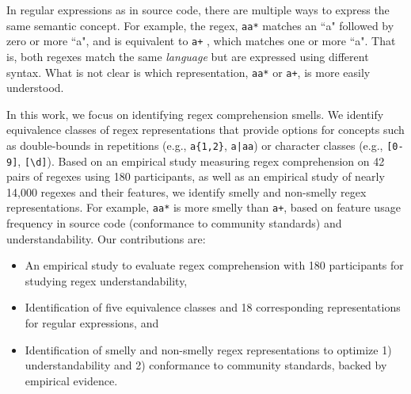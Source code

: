 In regular expressions as in source code, there are multiple ways to express the same semantic concept.
For example, the regex, \verb!aa*! matches an ``a" followed by zero or more ``a", and is equivalent to \verb!a+! , which matches one or more ``a".
That is, both regexes match the same \emph{language} but are expressed using different syntax. What is not clear is which representation, \verb!aa*! or \verb!a+!, is more easily understood.

In this work, we focus on identifying regex comprehension smells.
We identify equivalence classes of regex representations that provide options for concepts such as double-bounds in repetitions (e.g., \verb!a{1,2}!, \verb!a|aa!) or
character classes (e.g., \verb![0-9]!, \verb![\d]!).
Based on an empirical study measuring regex comprehension on 42 pairs of regexes using 180 participants, as well as an empirical study of nearly 14,000 regexes and their features, we identify smelly and non-smelly regex representations. For example, \verb!aa*! is more smelly than \verb!a+!, based on feature usage frequency in source code (conformance to community standards) and understandability.
Our contributions are:

\vspace{-3pt}
\begin{itemize}
\item An empirical study to evaluate regex comprehension with 180 participants for studying regex understandability,
\item Identification of five equivalence classes and 18 corresponding representations for regular expressions, and
\item Identification of smelly and non-smelly regex representations to optimize 1) understandability and 2) conformance to community standards, backed by empirical evidence.
\end{itemize}
\vspace{-3pt}

